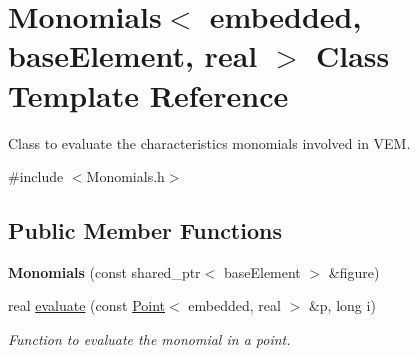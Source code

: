 \hypertarget{class_monomials}{}\section{Monomials$<$ embedded, base\+Element, real $>$ Class Template Reference}
\label{class_monomials}


Class to evaluate the characteristics monomials involved in V\+EM.  




{\ttfamily \#include $<$Monomials.\+h$>$}

\subsection*{Public Member Functions}
\begin{DoxyCompactItemize}
\item 
{\bfseries Monomials} (const shared\+\_\+ptr$<$ base\+Element $>$ \&figure)\hypertarget{class_monomials_a212df6457fef6be449cfe3eb7d6db655}{}\label{class_monomials_a212df6457fef6be449cfe3eb7d6db655}

\item 
real \hyperlink{class_monomials_af0419328667c105b93cb65a7f4de2dd8}{evaluate} (const \hyperlink{class_point}{Point}$<$ embedded, real $>$ \&p, long i)
\begin{DoxyCompactList}\small\item\em Function to evaluate the monomial in a point. \end{DoxyCompactList}\end{DoxyCompactItemize}

